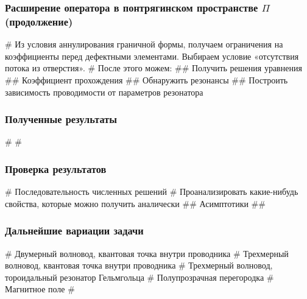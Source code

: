 \documentclass{beamer}
\begin{document}
\begin{frame}[fragile]
\frametitle{Расширение оператора в понтрягинском пространстве $\Pi$ (продолжение)}
\begin{easylist}[itemize]
# Из условия аннулирования граничной формы, получаем ограничения на коэффициенты перед дефектными элементами. Выбираем условие «отсутствия потока из отверстия».
# После этого можем:
## Получить решения уравнения
## Коэффициент прохождения
## Обнаружить резонансы
## Построить зависимость проводимости от параметров резонатора
\end{easylist}
\end{frame}


\begin{frame}[fragile]
\frametitle{Полученные результаты}
\begin{easylist}[itemize]
# 
# 
\end{easylist}
\end{frame}


\begin{frame}[fragile]
\frametitle{Проверка результатов}
\begin{easylist}[itemize]
# Последовательность численных решений
# Проанализировать какие-нибудь свойства, которые можно получить аналически
## Асимптотики
## 
\end{easylist}
\end{frame}


\begin{frame}[fragile]
\frametitle{Дальнейшие вариации задачи}
\begin{easylist}[itemize]
# Двумерный волновод, квантовая точка внутри проводника
# Трехмерный волновод, квантовая точка внутри проводника
# Трехмерный волновод, тороидальный резонатор Гельмгольца 
# Полупрозрачная перегородка 
# Магнитное поле 
# 
\end{easylist}
\end{frame}
\end{document}
